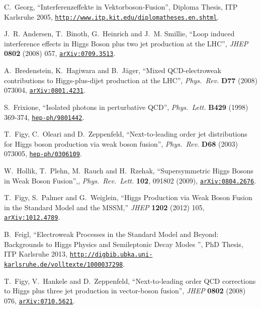 \documentclass[english,12pt]{article}
\begin{document}
\begin{thebibliography}{10}
C.~Georg, ``Interferenzeffekte in Vektorboson-Fusion'', {Diploma Thesis, ITP
  Karlsruhe 2005}, {\href{http://www.itp.kit.edu/diplomatheses.en.shtml}{\tt http://www.itp.kit.edu/diplomatheses.en.shtml}}.

J.~R. Andersen, T.~Binoth, G.~Heinrich and J.~M. Smillie, ``{Loop induced
  interference effects in Higgs Boson plus two jet production at the LHC}'',
  {\em JHEP} {\bf 0802} (2008) 057,
\href{http://www.arXiv.org/abs/0709.3513}{{\tt arXiv:0709.3513}}.

A.~Bredenstein, K.~Hagiwara and B.~J\"{a}ger, ``{Mixed QCD-electroweak
  contributions to Higgs-plus-dijet production at the LHC}'', {\em Phys.\ Rev.}
  {\bf D77} (2008) 073004,
\href{http://www.arXiv.org/abs/0801.4231}{{\tt arXiv:0801.4231}}.

S.~Frixione,
  ``Isolated photons in perturbative QCD'',
  {\em Phys.\ Lett.} {\bf B429} (1998) 369-374,
\href{http://www.arXiv.org/abs/hep-ph/9801442}{{\tt hep-ph/9801442}}.

T.~Figy, C.~Oleari and D.~Zeppenfeld, ``Next-to-leading order jet
  distributions for Higgs boson production via weak boson fusion'', {\em Phys.\
  Rev.} {\bf D68} (2003) 073005,
\href{http://www.arXiv.org/abs/hep-ph/0306109}{{\tt hep-ph/0306109}}.

  W.~Hollik, T.~Plehn, M.~Rauch and H.~Rzehak,
  ``Supersymmetric Higgs Bosons in Weak Boson Fusion'',,
  {\em Phys.\ Rev.\ Lett.} {\bf 102}, 091802 (2009),
  \href{http://www.arXiv.org/abs/0804.2676}{{\tt arXiv:0804.2676}}.

 T.~Figy, S.~Palmer and G.~Weiglein,
 ``Higgs Production via Weak Boson Fusion in the Standard Model and the MSSM,''
 {\em JHEP} {\bf 1202} (2012) 105,
 \href{http://www.arXiv.org/abs/1012.4789}{{\tt arXiv:1012.4789}}.

B.~Feigl, ``Electroweak Processes in the Standard Model and Beyond: Backgrounds to Higgs Physics and Semileptonic Decay Modes '', {PhD Thesis, ITP Karlsruhe 2013}, 
\href{http://digbib.ubka.uni-karlsruhe.de/volltexte/1000037298}{{\tt http://digbib.ubka.uni-karlsruhe.de/volltexte/1000037298}}.

T.~Figy, V.~Hankele and D.~Zeppenfeld, ``{Next-to-leading order QCD
  corrections to Higgs plus three jet production in vector-boson fusion}'',
  {\em JHEP} {\bf 0802} (2008) 076,
\href{http://www.arXiv.org/abs/0710.5621}{{\tt arXiv:0710.5621}}.


\end{thebibliography}
\end{document}
